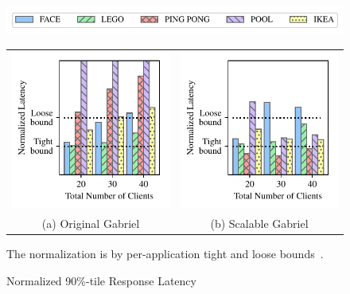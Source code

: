 \begin{figure}[]
	\begin{center}
		\includegraphics[width=\linewidth]{FIGS/fig-alloc-latency-legend.pdf}
								
		\begin{tabular}{c@{}c}
			\includegraphics[width=.5\linewidth]{FIGS/fig-eval-latency-baseline.pdf}
			            & \includegraphics[width=.5\linewidth]{FIGS/fig-eval-latency-cpushares.pdf} \\
			{(a) Original  Gabriel} & {(b) Scalable Gabriel}                                                    
		\end{tabular}
	\end{center}

\begin{captiontext}
\centering
The normalization is by per-application tight and loose
bounds~\cite{chen2017empirical}.
\end{captiontext}
\vspace{-0.1in}
	\caption{Normalized 90\%-tile Response Latency}
	\label{fig:frame-latency}
\end{figure}


